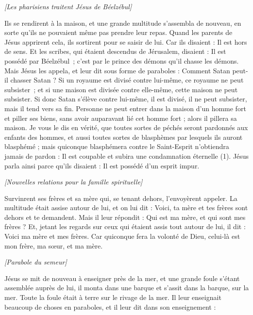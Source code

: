 \begin{multicols}{2}
\begin{center}
\textit{[Les pharisiens traitent Jésus de Béelzébul]}
\end{center}
\PPE{}
Ils se rendirent à la maison, et une grande multitude s’assembla de nouveau, en sorte qu’ils ne pouvaient même pas prendre leur repas.
Quand les parents de Jésus apprirent cela, ils sortirent pour se saisir de lui. Car ils disaient : Il est hors de sens.
Et les scribes, qui étaient descendus de Jérusalem, disaient : Il est possédé par Béelzébul ; c’est par le prince des démons qu’il chasse les démons.
Mais Jésus les appela, et leur dit sous forme de paraboles : Comment Satan peut-il chasser Satan ?
Si un royaume est divisé contre lui-même, ce royaume ne peut subsister ;
et si une maison est divisée contre elle-même, cette maison ne peut subsister.
Si donc Satan s'élève contre lui-même, il est divisé, il ne peut subsister, mais il tend vers sa fin.
Personne ne peut entrer dans la maison d'un homme fort et piller ses biens, sans avoir auparavant lié cet homme fort ; alors il pillera sa maison.
Je vous le dis en vérité, que toutes sortes de péchés seront pardonnés aux enfants des hommes, et aussi toutes sortes de blasphèmes par lesquels ils auront blasphémé ;
mais quiconque blasphémera contre le Saint-Esprit n’obtiendra jamais de pardon : Il est coupable et subira une condamnation éternelle (1).
Jésus parla ainsi parce qu'ils disaient : Il est possédé d'un esprit impur.
\begin{center}
\textit{[Nouvelles relations pour la famille spirituelle]}
\end{center}
\PPE{}
Survinrent ses frères et sa mère qui, se tenant dehors, l'envoyèrent appeler. La multitude était assise autour de lui,
et on lui dit : Voici, ta mère et tes frères sont dehors et te demandent.
Mais il leur répondit : Qui est ma mère, et qui sont mes frères ?
Et, jetant les regards sur ceux qui étaient assis tout autour de lui, il dit : Voici ma mère et mes frères.
Car quiconque fera la volonté de Dieu, celui-là est mon frère, ma sœur, et ma mère.
\begin{center}
\textit{[Parabole du semeur]}
\end{center}
\VerseOne{}Jésus se mit de nouveau à enseigner près de la mer, et une grande foule s’étant assemblée auprès de lui, il monta dans une barque et s’assit dans la barque, sur la mer. Toute la foule était à terre sur le rivage de la mer.
Il leur enseignait beaucoup de choses en paraboles, et il leur dit dans son enseignement :

\end{multicols}
